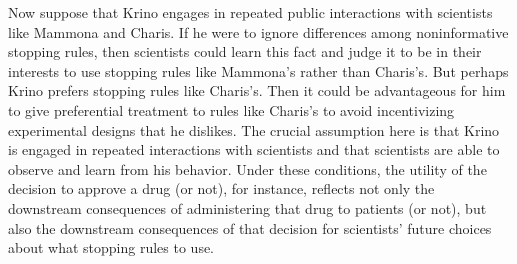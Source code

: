 \documentclass{article}
\theoremstyle{definition}
\begin{document}
Now suppose that Krino engages in repeated public interactions with scientists like Mammona and Charis.
If he were to ignore differences among noninformative stopping rules, then scientists could learn this fact and judge it to be in their interests to use stopping rules like Mammona's rather than Charis's.
But perhaps Krino prefers stopping rules like Charis's.
Then it could be advantageous for him to give preferential treatment to rules like Charis's to avoid incentivizing experimental designs that he dislikes.
The crucial assumption here is that Krino is engaged in repeated interactions with scientists and that scientists are able to observe and learn from his behavior.
Under these conditions, the utility of the decision to approve a drug (or not), for instance, reflects not only the downstream consequences of administering that drug to patients (or not), but also the downstream consequences of that decision for scientists' future choices about what stopping rules to use.
\end{document}
